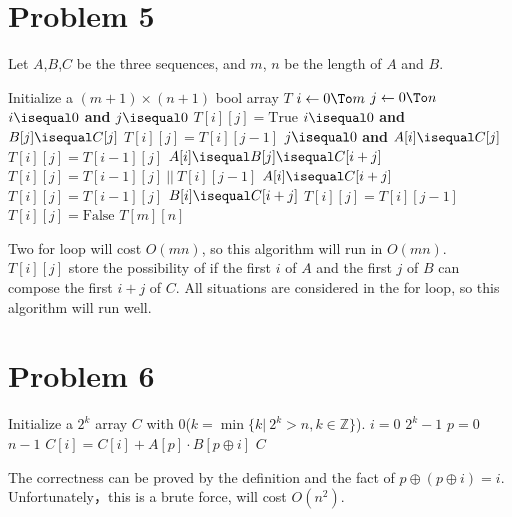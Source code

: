 \documentclass{article}
\begin{document}
\pagebreak
\section*{Problem 5}
Let $A$,$B$,$C$ be the three sequences, 
and $m$, $n$ be the length of $A$ and $B$.
\begin{codebox}
\li Initialize a $(m+1)\times (n+1)$ bool array $T$
\li \For $i\gets 0 \To m$
\li \Do \For $j\gets 0 \To n$
\li     \Do \If $i\isequal 0$ \textbf{and} $j\isequal 0$
\li         \Then $T[i][j]=\text{True}$
\li         \ElseIf $i\isequal 0$ \textbf{and} $B[j]\isequal C[j] $
\li         \Then $T[i][j]=T[i][j-1]$
\li         \ElseIf $j\isequal 0$ \textbf{and} $A[i]\isequal C[j] $
\li         \Then $T[i][j]=T[i-1][j]$
\li         \ElseIf $A[i]\isequal B[j]\isequal C[i+j]$
\li         \Then $T[i][j]=T[i-1][j]\ ||\ T[i][j-1]$
\li         \ElseIf $A[i]\isequal C[i+j]$
\li         \Then $T[i][j]=T[i-1][j]$
\li         \ElseIf $B[i]\isequal C[i+j]$
\li         \Then $T[i][j]=T[i][j-1]$
\li         \Else
\li             $T[i][j]=\text{{False}}$
            \End
        \End
    \End
\li \Return $T[m][n]$
\end{codebox}
Two for loop will cost $O(mn)$, so this algorithm will run in $O(mn)$.\\

\noindent
$T[i][j]$ store the possibility of if the first $i$ of $A$ and
the first $j$ of $B$ can compose the first $i+j$ of $C$.
All situations are considered in the for loop, so this algorithm will run well.

\pagebreak
\section*{Problem 6}
\begin{codebox}
\li Initialize a $2^k$ array $C$ with $0$($k=\min\{k|\ 2^k>n,k\in \mathbb{Z}\}$).
\li \For $i=0$ \To $2^k-1$
\li \Do \For $p=0$ \To $n-1$
\li     \Do $C[i] = C[i]+A[p]\cdot B[p\oplus i]$
        \End
    \End
\li \Return $C$
\end{codebox}

The correctness can be proved by the definition and the fact of $p\oplus(p\oplus i)=i$.
Unfortunately，this is a brute force, will cost $O(n^2)$.
\end{document}

